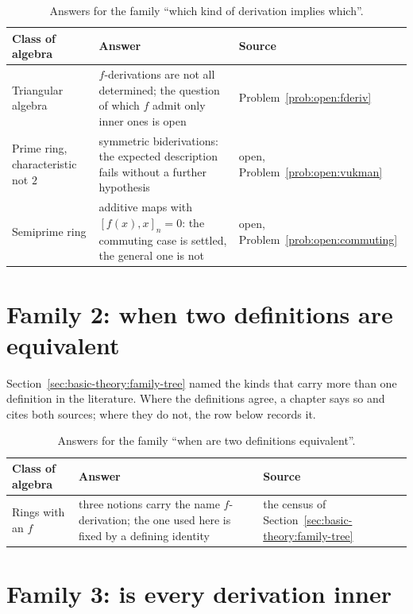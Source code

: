 \begin{table}[htbp]
  \centering
  \caption{Answers for the family ``which kind of derivation implies which''.}
  \label{tab:q:implications}
  \begin{tabular}{p{}p{}p{}}
    \toprule
    Class of algebra & Answer & Source \\
    \midrule
    Triangular algebra & $f$-derivations are not all determined; the
      question of which $f$ admit only inner ones is open &
      Problem~\ref{prob:open:fderiv} \\
    Prime ring, characteristic not $2$ & symmetric biderivations: the
      expected description fails without a further hypothesis & open,
      Problem~\ref{prob:open:vukman} \\
    Semiprime ring & additive maps with $[f(x),x]_n=0$: the commuting
      case is settled, the general one is not & open,
      Problem~\ref{prob:open:commuting} \\
    \bottomrule
  \end{tabular}
\end{table}

\section{Family 2: when two definitions are equivalent}

Section~\ref{sec:basic-theory:family-tree} named the kinds that carry more than
one definition in the literature.
Where the definitions agree, a chapter says so and cites both sources; where
they do not, the row below records it.

\begin{table}[htbp]
  \centering
  \caption{Answers for the family ``when are two definitions equivalent''.}
  \label{tab:q:definitions}
  \begin{tabular}{p{}p{}p{}}
    \toprule
    Class of algebra & Answer & Source \\
    \midrule
    Rings with an $f$ & three notions carry the name $f$-derivation; the
      one used here is fixed by a defining identity & the census of
      Section~\ref{sec:basic-theory:family-tree} \\
    \bottomrule
  \end{tabular}
\end{table}

\section{Family 3: is every derivation inner}

